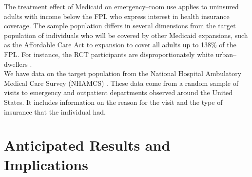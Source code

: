 \documentclass{article}
\begin{document}
The treatment effect of Medicaid on emergency--room use applies to uninsured adults with income below the FPL who express interest in health insurance coverage. The sample population differs in several dimensions from the target population of individuals who will be covered by other Medicaid expansions, such as the Affordable Care Act to expansion to cover all adults up to 138\% of the FPL. For instance, the RCT participants are disproportionately white urban--dwellers \cite{Taubman}. \\
 
We have data on the target population from the National Hospital Ambulatory Medical Care Survey (NHAMCS) \cite{NHAMCS}.  These data come from a random sample of visits to emergency and outpatient departments observed around the United States.  It includes information on the reason for the visit and the type of insurance that the individual had. %

\section{Anticipated Results and Implications}




\end{document}
